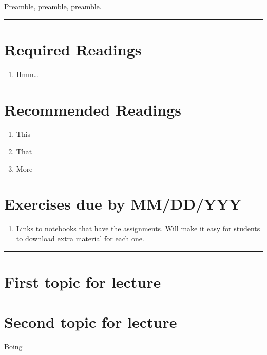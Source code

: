 \documentclass[]{book}
\providecommand{\tightlist}{%
  \setlength{\itemsep}{0pt}\setlength{\parskip}{0pt}}
\begin{document}
Preamble, preamble, preamble.

\begin{center}\rule{0.5\linewidth}{\linethickness}\end{center}

\hypertarget{required-readings-5}{%
\section*{Required Readings}\label{required-readings-5}}

\begin{enumerate}
\def\labelenumi{\arabic{enumi}.}
\tightlist
\item
  Hmm\ldots{}
\end{enumerate}

\hypertarget{recommended-readings-5}{%
\section*{Recommended Readings}\label{recommended-readings-5}}

\begin{enumerate}
\def\labelenumi{\arabic{enumi}.}
\tightlist
\item
  This
\item
  That
\item
  More
\end{enumerate}

\hypertarget{exercises-due-by-mmddyyy-5}{%
\section*{Exercises due by MM/DD/YYY}\label{exercises-due-by-mmddyyy-5}}

\begin{enumerate}
\def\labelenumi{\arabic{enumi}.}
\tightlist
\item
  Links to notebooks that have the assignments. Will make it
  easy for students to download extra material for each one.
\end{enumerate}

\begin{center}\rule{0.5\linewidth}{\linethickness}\end{center}

\hypertarget{first-topic-for-lecture-4}{%
\section{First topic for lecture}\label{first-topic-for-lecture-4}}

\hypertarget{second-topic-for-lecture-4}{%
\section{Second topic for lecture}\label{second-topic-for-lecture-4}}

Boing


\end{document}
